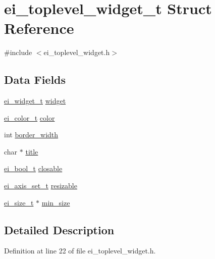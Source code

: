 \hypertarget{structei__toplevel__widget__t}{\section{ei\-\_\-toplevel\-\_\-widget\-\_\-t Struct Reference}
\label{structei__toplevel__widget__t}
}


{\ttfamily \#include $<$ei\-\_\-toplevel\-\_\-widget.\-h$>$}

\subsection*{Data Fields}
\begin{DoxyCompactItemize}
\item 
\hyperlink{structei__widget__t}{ei\-\_\-widget\-\_\-t} \hyperlink{structei__toplevel__widget__t_a72894e216cd78fbfe56f6e834ece4385}{widget}
\item 
\hyperlink{structei__color__t}{ei\-\_\-color\-\_\-t} \hyperlink{structei__toplevel__widget__t_a2d580b44e8d350f1b6d5af8d84802bc0}{color}
\item 
int \hyperlink{structei__toplevel__widget__t_a6f8b26f1614ee8f1e552e6792d49e90b}{border\-\_\-width}
\item 
char $\ast$ \hyperlink{structei__toplevel__widget__t_a6ed66d8c09149914ebf42fd122df33dc}{title}
\item 
\hyperlink{ei__types_8h_a383b9af13bd6a0a893096ead3c4d8e28}{ei\-\_\-bool\-\_\-t} \hyperlink{structei__toplevel__widget__t_a1710c07d0ecdc5129c984cc98ec08507}{closable}
\item 
\hyperlink{ei__types_8h_ab5d9ff46ba9b2c9fa6d6fbd2594c6439}{ei\-\_\-axis\-\_\-set\-\_\-t} \hyperlink{structei__toplevel__widget__t_a2f1fffc879dd73e27a0b70ff3a152fc5}{resizable}
\item 
\hyperlink{structei__size__t}{ei\-\_\-size\-\_\-t} $\ast$ \hyperlink{structei__toplevel__widget__t_a6907cc11a098f8aeb3df806535de165b}{min\-\_\-size}
\end{DoxyCompactItemize}


\subsection{Detailed Description}


Definition at line 22 of file ei\-\_\-toplevel\-\_\-widget.\-h.



